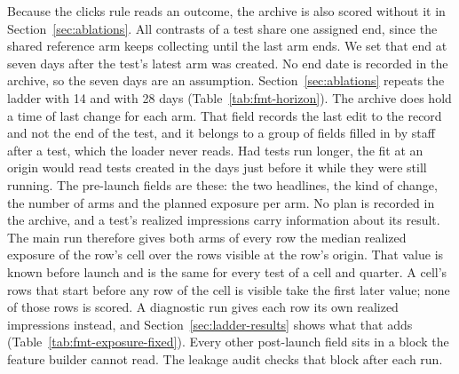 \documentclass[sigconf,nonacm]{acmart}
\begin{document}
Because the clicks rule reads an outcome, the archive is also scored without it in Section~\ref{sec:ablations}. All contrasts of a test share one assigned end, since the shared reference arm keeps collecting until the last arm ends. We set that end at seven days after the test's latest arm was created. No end date is recorded in the archive, so the seven days are an assumption. Section~\ref{sec:ablations} repeats the ladder with 14 and with 28 days (Table~\ref{tab:fmt-horizon}). The archive does hold a time of last change for each arm. That field records the last edit to the record and not the end of the test, and it belongs to a group of fields filled in by staff after a test, which the loader never reads. Had tests run longer, the fit at an origin would read tests created in the days just before it while they were still running. The pre-launch fields are these: the two headlines, the kind of change, the number of arms and the planned exposure per arm. No plan is recorded in the archive, and a test's realized impressions carry information about its result. The main run therefore gives both arms of every row the median realized exposure of the row's cell over the rows visible at the row's origin. That value is known before launch and is the same for every test of a cell and quarter. A cell's rows that start before any row of the cell is visible take the first later value; none of those rows is scored. A diagnostic run gives each row its own realized impressions instead, and Section~\ref{sec:ladder-results} shows what that adds (Table~\ref{tab:fmt-exposure-fixed}). Every other post-launch field sits in a block the feature builder cannot read. The leakage audit checks that block after each run.
\end{document}

